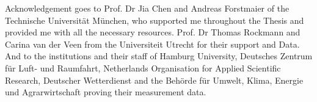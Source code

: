 Acknowledgement goes to Prof. Dr Jia Chen and Andreas Forstmaier of the Technische Universität München, who supported me throughout the Thesis and provided me with all the necessary resources. Prof. Dr Thomas Rockmann and Carina van der Veen from the Universiteit Utrecht for their support and Data. And to the institutions and their staff of Hamburg University, Deutsches Zentrum für Luft- und Raumfahrt, Netherlands Organisation for Applied Scientific Research, Deutscher Wetterdienst and the Behörde für Umwelt, Klima, Energie und Agrarwirtschaft proving their measurement data.
